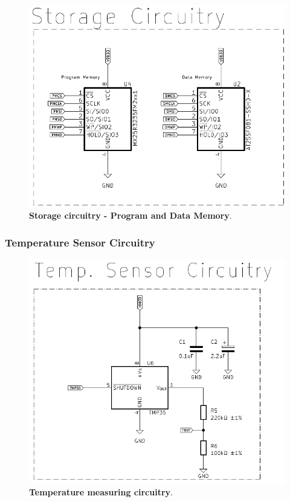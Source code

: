\begin{figure}[H]
    \centering
    \includegraphics[scale = 0.6]{imagens/storageCircuitry.png}
    \caption{\textbf{Storage circuitry - Program and Data Memory}.}
    \label{02fig:storageCircuitry}
\end{figure}








\subsubsection{Temperature Sensor Circuitry}\label{02SubSub:TemperatureSensorCircuitry}




\begin{figure}[H]
    \centering
    \includegraphics[scale = 0.6]{imagens/temperatureSensorCircuitry.png}
    \caption{\textbf{Temperature measuring circuitry}.}
    \label{02fig:temperatureSensorCircuitry}
\end{figure}



